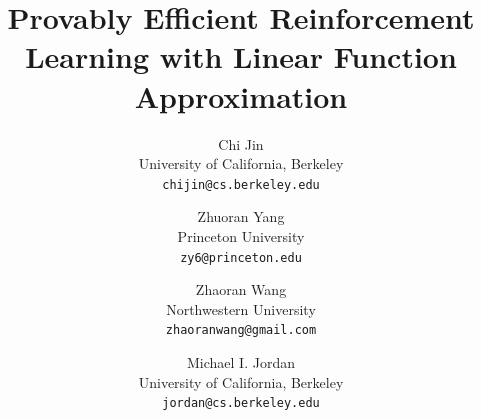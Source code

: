\documentclass[11pt]{article}
\theoremstyle{definition}
\let\hat\widehat
\begin{document}
\title{\textbf{Provably Efficient Reinforcement Learning with Linear Function Approximation}}

\newcommand{\authorname}[1]{\makebox[6cm][c]{#1}}

\author{Chi Jin \\ University of California, Berkeley \\ \texttt{chijin@cs.berkeley.edu}
\and 
Zhuoran Yang \\ Princeton University \\ \texttt{zy6@princeton.edu}
\and
Zhaoran Wang \\ Northwestern University \\ \texttt{zhaoranwang@gmail.com}
\and
Michael I. Jordan \\ University of California, Berkeley \\ \texttt{jordan@cs.berkeley.edu}}

\date{}

\maketitle

\newcommand{\cnote}{\textcolor[rgb]{1,0,0}{Chi: }\textcolor[rgb]{1,0,1}}
\newcommand{\wnote}{\textcolor[rgb]{1,0,0}{Zhaoran: }\textcolor[rgb]{0,1,1}}
\newcommand{\znote}{\textcolor[rgb]{1,0,0}{Zhuoran: }\textcolor[rgb]{0, 0.5, 1}}


\newcommand{\ind}[3]{{#1}^{#2}_{#3}} %
\newcommand{\sind}[3]{{#1}^{#2}_{#3}} %
\newcommand{\empP}[2]{\hat{\mathbb{P}}^{#1}_{#2}}
\newcommand{\VV}{\mathbb{V}}
\newcommand{\empVV}[2]{\hat{\mathbb{V}}^{#1}_{#2}}
\newcommand{\logt}{\iota}
\newcommand{\cF}{\mathcal{F}}
\newcommand{\fN}{\mathfrak{N}}
\newcommand{\fM}{\mathfrak{M}}
\newcommand{\Ea}{\E_{a^\star}}
\newcommand{\Pa}{\P_{a^\star}}
\newcommand{\done}{\mathbb{I}}
\newcommand{\bphi}{\bm{\phi}}
\newcommand{\bpsi}{\bm{\psi}}
\newcommand{\bmu}{\bm{\mu}}

\newcommand{\bu}{\bm{u}}
\newcommand{\bv}{\bm{v}}
\newcommand{\btheta}{\bm{\theta}}
\newcommand{\bPhi}{\bm{\Phi}}
\newcommand{\bPsi}{\bm{\Psi}}
\newcommand{\fE}{\mathfrak{E}}
\newcommand{\la}{\langle}
\newcommand{\ra}{\rangle}
\end{document}
